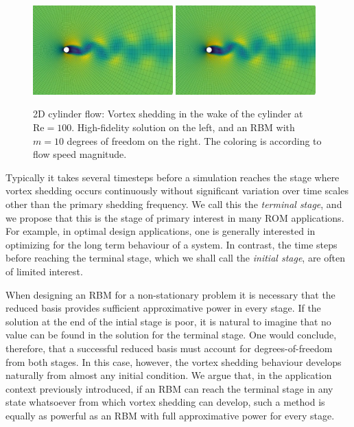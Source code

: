 \documentclass[a4paper]{jpconf}
\begin{document}
\begin{figure}
  \begin{center}
    \includegraphics[width=0.48\textwidth]{figs/vortices-hi}
    \includegraphics[width=0.48\textwidth]{figs/vortices-lo}
  \end{center}
  \caption{
    2D cylinder flow: Vortex shedding in the wake of the cylinder at
    $\text{Re} = 100$. High-fidelity solution on the left, and an RBM
    with $m=10$ degrees of freedom on the right. The coloring is
    according to flow speed magnitude.
  }
  \label{fig:vortices}
\end{figure}

Typically it takes several timesteps before a simulation reaches the
stage where vortex shedding occurs continuously without significant
variation over time scales other than the primary shedding frequency.
We call this the \emph{terminal stage}, and we propose that this is
the stage of primary interest in many ROM applications.  For example,
in optimal design applications, one is generally interested in
optimizing for the long term behaviour of a system. In contrast, the
time steps before reaching the terminal stage, which we shall call the
\emph{initial stage}, are often of limited interest.

When designing an RBM for a non-stationary problem it is necessary
that the reduced basis provides sufficient approximative power in
every stage.  If the solution at the end of the intial stage is poor,
it is natural to imagine that no value can be found in the solution
for the terminal stage.  One would conclude, therefore, that a
successful reduced basis must account for degrees-of-freedom from both
stages. In this case, however, the vortex shedding behaviour develops
naturally from almost any initial condition.  We argue that, in the
application context previously introduced, if an RBM can reach the
terminal stage in any state whatsoever from which vortex shedding can
develop, such a method is equally as powerful as an RBM with full
approximative power for every stage.
\end{document}
